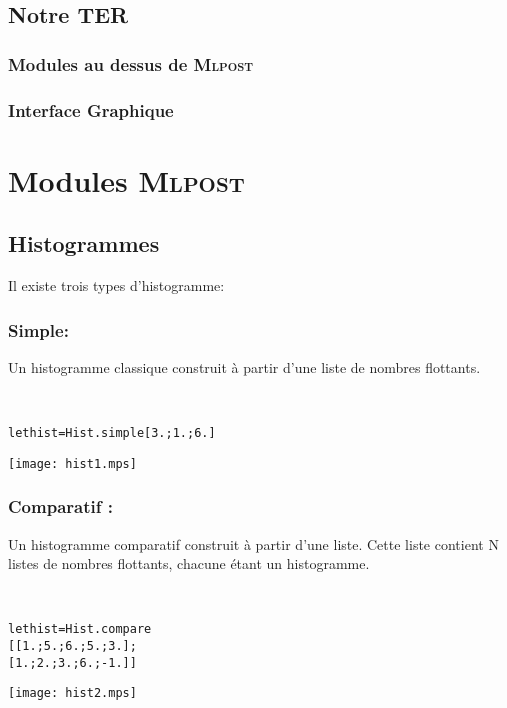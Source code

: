 \documentclass[a4paper,12pt]{article}
\newcommand{\mlpost}{\textsc{Mlpost}}
\begin{document}
\subsection{Notre TER}
\subsubsection{Modules au dessus de \mlpost}
\subsubsection{Interface Graphique}

\section{Modules \mlpost}


\subsection{Histogrammes}
Il existe trois types d'histogramme:

\subsubsection{Simple:}
Un histogramme classique construit à partir d'une liste de nombres
flottants.

~\\

\begin{minipage}{0.5\linewidth}
  \begin{alltt}
    let hist = Hist.simple [3.;1.;6.]
  \end{alltt}
\end{minipage}
\begin{minipage}{0.5\linewidth}
  \begin{center}
    \texttt{[image: hist1.mps]}
  \end{center}
\end{minipage}

\subsubsection{Comparatif :} 
Un histogramme comparatif construit à partir d'une liste. Cette liste
contient N listes de nombres flottants, chacune étant un histogramme.

~\\

\begin{minipage}{0.5\linewidth}
  \begin{alltt}
    let hist = Hist.compare
    [[1.;5.;6.;5.;3.];
      [1.;2.;3.;6.;-1.]]
  \end{alltt}
\end{minipage}
\begin{minipage}{0.5\linewidth}
\begin{center}
\texttt{[image: hist2.mps]}
\end{center}
\end{minipage}
\end{document}
